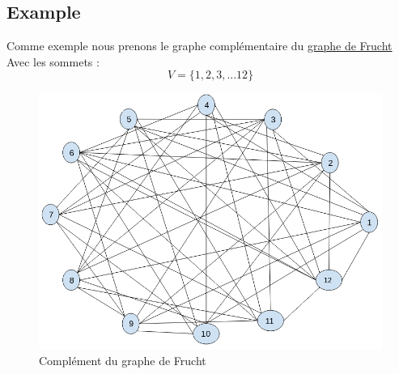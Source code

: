 \documentclass{article}
\begin{document}
\subsection{Example}
Comme exemple nous prenons le graphe complémentaire du \href{https://en.wikipedia.org/wiki/Frucht\_graph}{graphe de Frucht}
Avec les sommets :
\begin{displaymath}
  V=\{1,2,3,...12\}
\end{displaymath}
\begin{center}
  \begin{figure}[!htp]
    \caption{Complément du graphe de Frucht}
    \includegraphics[scale=0.5]{Report/frucht-compl.png}
  \end{figure}
\end{center}
\end{document}
